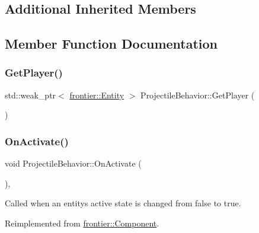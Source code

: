 \subsection*{Additional Inherited Members}


\subsection{Member Function Documentation}
\mbox{\label{class_projectile_behavior_ac0f47feec11bc48291c1d8721efe5bd8}} 
\subsubsection{\texorpdfstring{Get\+Player()}{GetPlayer()}}
{\footnotesize\ttfamily std\+::weak\+\_\+ptr$<$ \hyperlink{classfrontier_1_1_entity}{frontier\+::\+Entity} $>$ Projectile\+Behavior\+::\+Get\+Player (\begin{DoxyParamCaption}{ }\end{DoxyParamCaption})}

\mbox{\label{class_projectile_behavior_aa01c813e541f6069d7ca9c69848ca0a6}} 
\subsubsection{\texorpdfstring{On\+Activate()}{OnActivate()}}
{\footnotesize\ttfamily void Projectile\+Behavior\+::\+On\+Activate (\begin{DoxyParamCaption}{ }\end{DoxyParamCaption})\hspace{0.3cm}{\ttfamily [override]}, {\ttfamily [virtual]}}



Called when an entity\textquotesingle{}s active state is changed from false to true. 



Reimplemented from \hyperlink{classfrontier_1_1_component_a77fca7ba1960aafb9bc05905e300c79d}{frontier\+::\+Component}.

\mbox{\label{class_projectile_behavior_ab8caa701affecc1eaddb4bdc17152c23}} 

